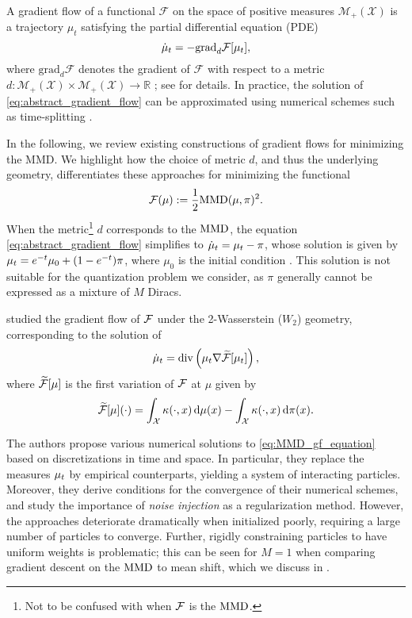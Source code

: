 A gradient flow of a functional $\mathcal{F}$ on the space of positive measures $\mathcal{M}_{+}(\mathcal{X})$ is a trajectory $\mu_{t}$ satisfying the partial differential equation (PDE) 
\begin{equation}\label{eq:abstract_gradient_flow}
   \dot{\mu}_t = -\mathrm{grad}_d \mathcal{F}[\mu_{t}],
\end{equation}
where $\mathrm{grad}_d \mathcal{F}$ denotes the gradient of $ \mathcal{F}$ with respect to a metric $d: \mathcal{M}_{+}(\mathcal{X}) \times \mathcal{M}_{+}(\mathcal{X}) \rightarrow \mathbb{R}$%
; see \cite{Ott01,AmGiSa08} for details. In practice, the solution of \eqref{eq:abstract_gradient_flow} can be approximated using numerical schemes such as time-splitting \citep{JoKiOt98}. 

In the following, we review existing constructions of gradient flows for minimizing the MMD. We highlight how the choice of metric $d$, and thus the underlying geometry, differentiates these approaches for minimizing the functional 
\begin{equation}\label{def:mmd}
    \mathcal{F}(\mu) := \frac{1}{2} \mathrm{MMD}(\mu, \pi)^2.
\end{equation}
When the metric\footnote{Not to be confused with when $\mathcal{F}$ is the $\operatorname{MMD}$.} $d$ corresponds to the $\operatorname{MMD}$, the equation \eqref{eq:abstract_gradient_flow} simplifies to $\dot{\mu}_t = \mu_{t} - \pi$, whose solution is given by $\mu_{t} = e^{-t} \mu_{0} + (1-e^{-t}) \pi$, where $\mu_{0}$ is the initial condition \citep[Theorem 3.4]{GlDvMiZh24}. %
This solution is not suitable for the quantization problem we consider, as $\pi$ generally cannot be expressed as a mixture of $M$ Diracs.




    

\citet{ArKoSaGr19} studied the gradient flow of $\mathcal{F}$ under the 2-Wasserstein ($W_2$) geometry, corresponding to the solution of
\begin{equation}\label{eq:MMD_gf_equation}
    \dot{\mu}_t = \mathrm{div} \left( \mu_{t}\nabla \widetilde{\mathcal{F}} [\mu_{t}] \right),
\end{equation}
where $\widetilde{\mathcal{F}}[\mu]$ is the first variation of $\mathcal{F}$ at $\mu$ given by
\begin{equation}\label{eq:MMD_first_variation}
\widetilde{\mathcal{F}}[\mu](\cdot) = \int_{\mathcal{X}} \kappa(\cdot,x)\,\mathrm{d}\mu(x) - \int_{\mathcal{X}} \kappa(\cdot,x)\,\mathrm{d}\pi(x).
\end{equation}

The authors propose various numerical solutions to \eqref{eq:MMD_gf_equation} based on discretizations in time and space. In particular, they replace the measures $\mu_{t}$ by empirical counterparts, yielding a system of interacting particles. Moreover, they derive conditions for the convergence of their numerical schemes, and study the importance of \emph{noise injection} as a regularization method.
However, the approaches deteriorate dramatically when initialized poorly, requiring a large number of particles to converge. Further, rigidly constraining particles to have uniform weights is problematic; this can be seen for $M=1$ when comparing gradient descent on the $\operatorname{MMD}$ to mean shift, which we discuss in .

